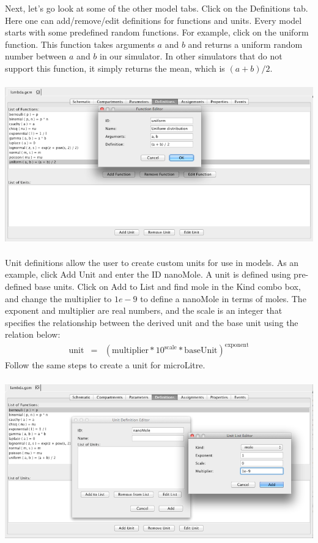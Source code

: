 \documentclass[titlepage,11pt]{article}
\begin{document}
Next, let's go look at some of the other model tabs.  Click on the Definitions tab.  Here one can add/remove/edit definitions for functions and units.  Every model starts with some predefined random functions.  For example, click on the uniform function.  This function takes arguments $a$ and $b$ and returns a uniform random number between $a$ and $b$ in our simulator.  In other simulators that do not support this function, it simply returns the mean, which is $(a + b)/2$.

\begin{center}
\includegraphics[height=70mm]{screenshots/function}
\end{center}

Unit definitions allow the user to create custom units for use in models.  As an example, click Add Unit and enter the ID nanoMole.  A unit is defined using pre-defined base units.  Click on Add to List and find mole in the Kind combo box, and change the multiplier to $1e-9$ to define a nanoMole in terms of moles. The exponent and multiplier are real numbers, and the scale is an integer that specifies the relationship between the derived unit and the base unit using the relation below:
\begin{eqnarray*}
\mathrm{unit} & = & (\mathrm{multiplier} * 10^\mathrm{scale} * \mathrm{baseUnit})^\mathrm{exponent}
\end{eqnarray*}
Follow the same steps to create a unit for microLitre.

\begin{center}
\includegraphics[height=70mm]{screenshots/units}
\end{center}
\end{document}
